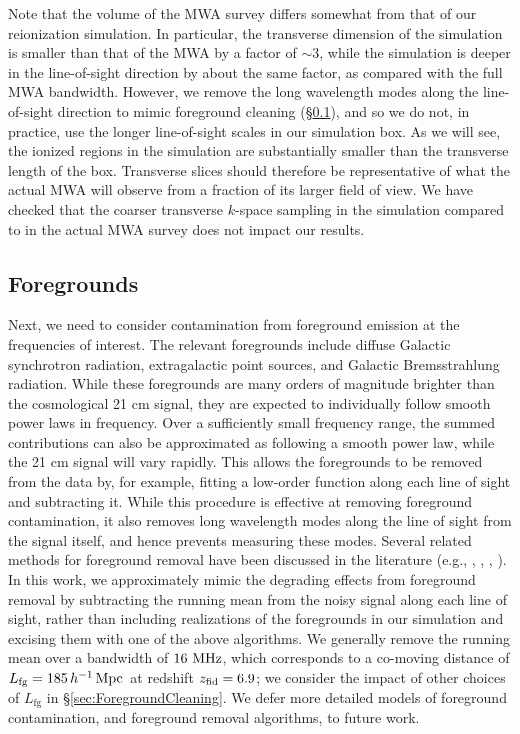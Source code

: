 Note that the volume of the MWA survey differs somewhat from that
of our reionization simulation. In particular, the transverse dimension
of the simulation is smaller than that of the MWA by a factor of $\sim 3$, while the simulation
is deeper in the line-of-sight direction by about the same factor, as compared with the full MWA bandwidth. However, we remove
the long wavelength modes along the line-of-sight direction to mimic foreground
cleaning (\S \ref{sec:foregrounds}), and so we do not, in practice, use the longer line-of-sight scales in our simulation
box. As we will see, the ionized regions in the simulation are substantially
smaller than the transverse length of the box. Transverse slices should therefore
be representative of what the actual MWA will observe from a fraction of its 
larger
field of view. We have checked that the coarser transverse $k$-space sampling in the simulation
compared to in the actual MWA survey does not impact our results.


\subsection{Foregrounds} \label{sec:foregrounds}


Next, we need to consider contamination from foreground emission 
at the frequencies of interest. The relevant foregrounds include
diffuse Galactic synchrotron radiation, extragalactic point
sources, and Galactic Bremsstrahlung radiation. While these
foregrounds are many orders of magnitude brighter than the
cosmological 21 cm signal, they are expected to individually follow
smooth power laws in frequency. Over a sufficiently small frequency range,
the summed contributions can also be approximated as
following a smooth power law, while the 21 cm signal will vary
rapidly. This allows the foregrounds to be removed from the data
by, for example, fitting a low-order function along each line of sight and subtracting
it. While this procedure is effective at removing foreground contamination, it also removes long wavelength
modes along the line of sight from the signal itself, and hence prevents measuring these modes. 
Several related methods for foreground removal have been discussed in the
literature (e.g., \citealt{Wang:2005zj},
\citealt{Harker:2009hg}, \citealt{Petrovic:2010me},
\citealt{Chapman:2012yj}). In this work, we approximately mimic the
degrading effects from foreground removal by subtracting the running
mean from the noisy signal along each line of sight, rather than
including realizations of the foregrounds in our simulation and excising
them with one of the above algorithms.
We generally remove the running mean over a bandwidth of $16\ \text{MHz}$, which corresponds
to a co-moving distance of $L_{\text{fg}} = 185\,h^{-1}\,{\rm Mpc}\,$ at redshift $z_{\rm fid} = 6.9$; we consider the impact of other choices of $L_{\text{fg}}$ in \S \ref{sec:ForegroundCleaning}.
We defer more detailed models of foreground contamination, and foreground
removal algorithms, to future work.




